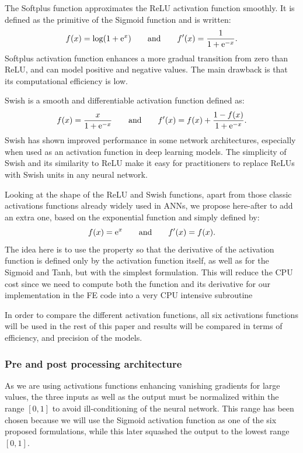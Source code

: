 \documentclass[algorithms,article,submit,pdftex,moreauthors]{Definitions/mdpi}
\DeclareRobustCommand{\e}[1]{{\rm e}^{#1}}
\begin{document}
The Softplus function \cite{Dugas-2000-ISO} approximates the ReLU activation function smoothly. It is defined as the primitive of the Sigmoid function and is written:
\begin{equation}
f(x) = \log\left(1+\e{x}\right)\qquad \text{and}\qquad f'(x) = \frac{1}{1+\e{-x}}.\label{eq:act-softplus}
\end{equation}
Softplus activation function enhances a more gradual transition from zero than ReLU, and can model positive and negative values.
The main drawback is that its computational efficiency is low.

Swish \cite{Ramachandran-2018-SAF} is a smooth and differentiable activation function defined as:
\begin{equation}
f(x) = \frac{x}{1+\e{-x}}\qquad \text{and}\qquad f'(x) =  f(x) + \frac{1 - f(x)}{1+\e{-x}}.\label{eq:act-swish}
\end{equation}
Swish has shown improved performance in some network architectures, especially when used as an activation function in deep learning models.
The simplicity of Swish and its similarity to ReLU make it easy for practitioners to replace ReLUs with Swish units in any neural network.
 
Looking at the shape of the ReLU and Swish functions, apart from those classic activations functions already widely used in ANNs, we propose here-after to add an extra one, based on the exponential function and simply defined by:
\begin{equation}
f(x) = \e{x}\qquad \text{and}\qquad f'(x) = f(x).\label{eq:act-exp}
\end{equation}
The idea here is to use the property so that the derivative of the activation function is defined only by the activation function itself, as well as for the Sigmoid and Tanh, but with the simplest formulation.
This will reduce the CPU cost since we need to compute both the function and its derivative for our implementation in the FE code into a very CPU intensive subroutine

In order to compare the different activation functions, all six activations functions will be used in the rest of this paper and results will be compared in terms of efficiency, and precision of the models.

\subsubsection{Pre and post processing architecture}\label{subsubsec:ANN-pre}
As we are using activations functions enhancing vanishing gradients for large values, the three inputs as well as the output must be normalized within the range $[0,1]$ to avoid ill-conditioning of the neural network.
This range has been chosen because we will use the Sigmoid activation function as one of the six proposed formulations, while this later squashed the output to the lowest range $[0,1]$.
\end{document}
